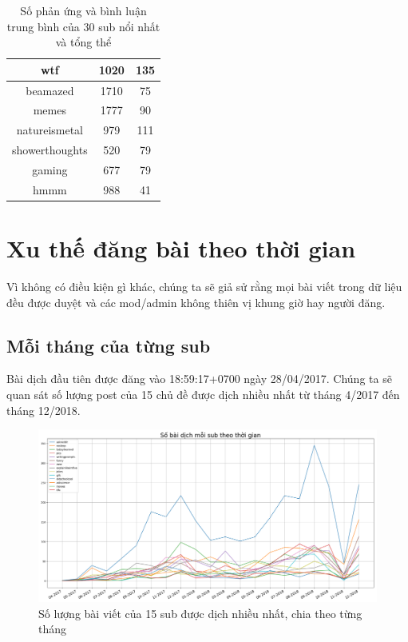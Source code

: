 \documentclass[10pt,a4paper]{article}
\begin{document}
\begin{table}[hp]
\begin{tabular}{|c|c|c|}
        \hline
        wtf & 1020 & 135 \\
        \hline
        beamazed & 1710 & 75 \\
        \hline
        memes & 1777 & 90 \\
        \hline
        natureismetal & 979 & 111 \\
        \hline
        showerthoughts & 520 & 79 \\
        \hline
        gaming & 677 & 79 \\
        \hline
        hmmm & 988 & 41 \\
        \hline
    \end{tabular} 
    \caption{Số phản ứng và bình luận trung bình của 30 sub nổi nhất và tổng thể}
    \label{tab:meaninterests}   
\end{table}

\section{Xu thế đăng bài theo thời gian}
Vì không có điều kiện gì khác, chúng ta sẽ giả sử rằng mọi bài viết trong dữ liệu đều được duyệt và các mod/admin không thiên vị khung giờ hay người đăng.

\subsection{Mỗi tháng của từng sub}

Bài dịch đầu tiên được đăng vào 18:59:17+0700 ngày 28/04/2017. Chúng ta sẽ quan sát số lượng post của 15 chủ đề được dịch nhiều nhất từ tháng 4/2017 đến tháng 12/2018.

\begin{figure}[h]
    \centering
    \includegraphics[width=\textwidth]{img/PostsOverTime.png}
    \caption{Số lượng bài viết của 15 sub được dịch nhiều nhất, chia theo từng tháng}
    \label{fig:postsovertime}
\end{figure}
\end{document}
